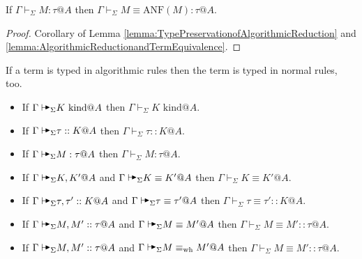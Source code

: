 \documentclass[9pt, a4paper]{extarticle}
\theoremstyle{break}
\newcommand{\G}{\Gamma}
\newcommand{\V}{\vdash_\Sigma}
\newcommand{\iskind}{\text{\ kind}}
\newcommand{\TB}{{\mathop{\blacktriangleright}}}
\newcommand{\E}{\equiv}
\newcommand{\AV}{\vdash\!\!\!\raisebox{0.4ex}{\scalebox{0.7}{$\TB$}}}
\newcommand{\AVS}{\AV_\Sigma\xspace}
\newcommand{\EWH}{\E_{\text{wh}}}
\newcommand{\ANF}{\text{ANF}}
\begin{document}
\begin{corollary}
    \label{corollary:ANFandTermEquivalence}
    If \( \G \V M : \tau @ A \) then \( \G \V M \E \ANF(M) : \tau @ A\).
\end{corollary}
\begin{proof}
    Corollary of Lemma \ref{lemma:TypePreservationofAlgorithmicReduction} and
    \ref{lemma:AlgorithmicReductionandTermEquivalence}.
\end{proof}

\begin{theorem}
    If a term is typed in algorithmic rules then the term is typed in normal rules, too.
    \begin{itemize}
        \item If \(\G\AVS K \iskind @ A \) then \(\G\V K \iskind @A \).
        \item If \(\G\AVS \tau :: K @ A \) then \(\G\V \tau ::K  @ A \).
        \item If \(\G\AVS M:\tau @ A \) then \(\G\V M:\tau @ A \).
        \item If \(\G\AVS K,K' @ A\) and \(\G\AVS K\E K' @ A \) then \(\G\V K\E K' @ A \).
        \item If \(\G\AVS \tau,\tau' :: K @ A \) and \(\G\AVS \tau \E \tau' @ A \) then \(\G\V \tau \E \tau' :: K @ A \).
        \item If \(\G\AVS M,M' :: \tau @ A \) and \(\G\AVS M\E M' @ A \) then \(\G\V M\E M' :: \tau @ A \).
        \item If \(\G\AVS M,M' :: \tau @ A \) and \(\G\AVS M\EWH M' @ A \) then \(\G\V M\E M' :: \tau @ A \).
    \end{itemize}
\end{theorem}
\end{document}
